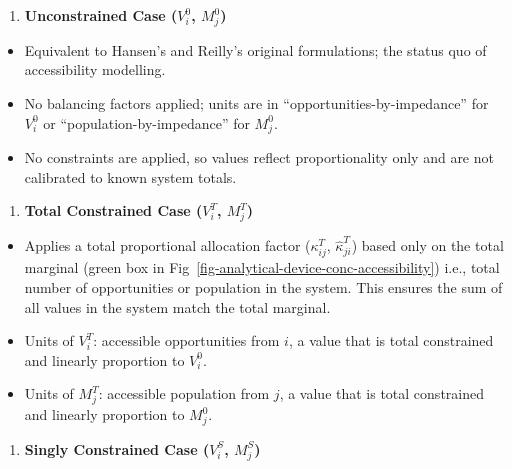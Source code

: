 \documentclass[
  10pt,
  letterpaper,
]{article}
\providecommand{\tightlist}{%
  \setlength{\itemsep}{0pt}\setlength{\parskip}{0pt}}\usepackage{longtable,booktabs,array}
\begin{document}
\begin{enumerate}
\def\labelenumi{\arabic{enumi}.}
\tightlist
\item
  \textbf{Unconstrained Case (\(V_i^0\), \(M_j^0\))}
\end{enumerate}

\begin{itemize}
\tightlist
\item
  Equivalent to Hansen's \citep{hansen1959} and Reilly's
  \citep{reilly1929methods} original formulations; the status quo of
  accessibility modelling.
\item
  No balancing factors applied; units are in
  ``opportunities-by-impedance'' for \(V_i^0\) or
  ``population-by-impedance'' for \(M_j^0\).
\item
  No constraints are applied, so values reflect proportionality only and
  are not calibrated to known system totals.
\end{itemize}

\begin{enumerate}
\def\labelenumi{\arabic{enumi}.}
\setcounter{enumi}{1}
\tightlist
\item
  \textbf{Total Constrained Case (\(V_i^T\), \(M_j^T\))}
\end{enumerate}

\begin{itemize}
\tightlist
\item
  Applies a total proportional allocation factor (\(\kappa_{ij}^T\),
  \(\hat \kappa_{ji}^T\)) based only on the total marginal (green box in
  Fig~\ref{fig-analytical-device-conc-accessibility}) i.e., total number
  of opportunities or population in the system. This ensures the sum of
  all values in the system match the total marginal.
\item
  Units of \(V_i^T\): accessible opportunities from \(i\), a value that
  is total constrained and linearly proportion to \(V_i^0\).
\item
  Units of \(M_j^T\): accessible population from \(j\), a value that is
  total constrained and linearly proportion to \(M_j^0\).
\end{itemize}

\begin{enumerate}
\def\labelenumi{\arabic{enumi}.}
\setcounter{enumi}{2}
\tightlist
\item
  \textbf{Singly Constrained Case (\(V_i^S\), \(M_j^S\))}
\end{enumerate}
\end{document}

